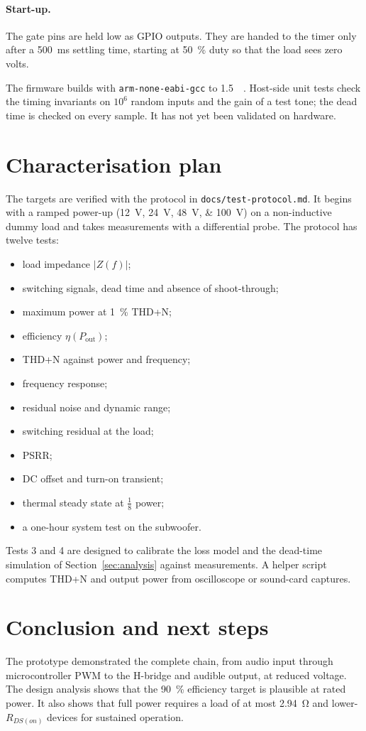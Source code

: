 \documentclass[10pt,a4paper]{article}
\begin{document}
\paragraph{Start-up.} The gate pins are held low as GPIO outputs. They are handed to the timer only after a \SI{500}{\milli\second} settling time, starting at \SI{50}{\percent} duty so that the load sees zero volts.

The firmware builds with \texttt{arm-none-eabi-gcc} to \SI{1.5}{\kilo\byte}. Host-side unit tests check the timing invariants on $10^6$ random inputs and the gain of a test tone; the dead time is checked on every sample. It has not yet been validated on hardware.

\section{Characterisation plan}\label{sec:protocol}
The targets are verified with the protocol in \texttt{docs/test-protocol.md}. It begins with a ramped power-up (\SIlist{12;24;48;100}{\volt}) on a non-inductive dummy load and takes measurements with a differential probe. The protocol has twelve tests:
\begin{itemize}
\item[0.] load impedance $|Z(f)|$;
\item[1.] switching signals, dead time and absence of shoot-through;
\item[2.] maximum power at \SI{1}{\percent} THD+N;
\item[3.] efficiency $\eta(P_\mathrm{out})$;
\item[4.] THD+N against power and frequency;
\item[5.] frequency response;
\item[6.] residual noise and dynamic range;
\item[7.] switching residual at the load;
\item[8.] PSRR;
\item[9.] DC offset and turn-on transient;
\item[10.] thermal steady state at $\tfrac18$ power;
\item[11.] a one-hour system test on the subwoofer.
\end{itemize}
Tests 3 and 4 are designed to calibrate the loss model and the dead-time simulation of Section~\ref{sec:analysis} against measurements. A helper script computes THD+N and output power from oscilloscope or sound-card captures.

\section{Conclusion and next steps}
The prototype demonstrated the complete chain, from audio input through microcontroller PWM to the H-bridge and audible output, at reduced voltage. The design analysis shows that the \SI{90}{\percent} efficiency target is plausible at rated power. It also shows that full power requires a load of at most \SI{2.94}{\ohm} and lower-$R_{DS(on)}$ devices for sustained operation.
\end{document}
